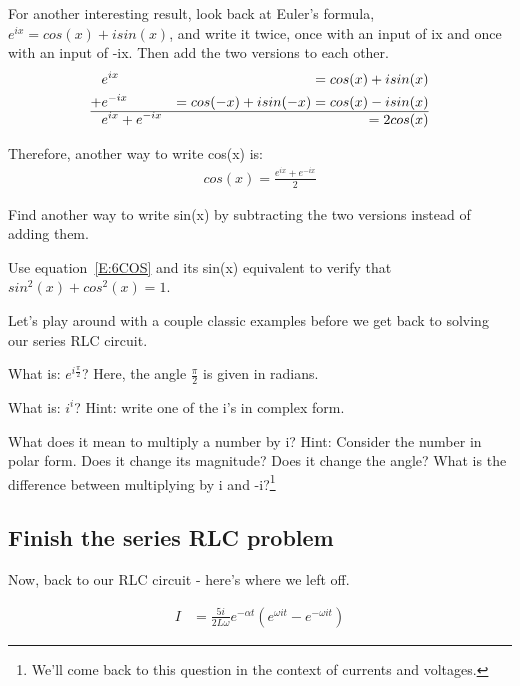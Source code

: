 For another interesting result, look back at Euler's formula, $e^{ix}=cos(x)+isin(x)$, and write it twice, once with an input of ix and once with an input of -ix. Then add the two versions to each other.
\begin{align}
&e^{ix}&=cos(x)+isin(x) \notag\\
+&e^{-ix}&=cos(-x)+isin(-x)=cos(x)-isin(x) \notag\\
\hline
&e^{ix}+e^{-ix}&=2cos(x)
\end{align}

Therefore, another way to write cos(x) is:
\begin{align}
cos(x)=\frac{e^{ix}+e^{-ix}}{2} \label{E:6COS}
\end{align}

\begin{clevel}
Find another way to write sin(x) by subtracting the two versions instead of adding them.
\end{clevel}

\begin{clevel}
Use equation~\eqref{E:6COS} and its sin(x) equivalent to verify that $sin^2(x)+cos^2(x)=1$.
\end{clevel}


Let's play around with a couple classic examples before we get back to solving our series RLC circuit.

\begin{blevel}
What is: $e^{i\frac{\pi}{2}}$? Here, the angle $\frac{\pi}{2}$ is given in radians.
\end{blevel}

\begin{blevel}
What is: $i^i$? Hint: write one of the i's in complex form. 
\end{blevel}

\begin{clevel}
What does it mean to multiply a number by i? Hint: Consider the number in polar form. Does it change its magnitude? Does it change the angle? What is the difference between multiplying by i and -i?\footnote{We'll come back to this question in the context of currents and voltages.}
\end{clevel}

\subsection{Finish the series RLC problem}
Now, back to our RLC circuit - here's where we left off.

\begin{align}
I&=\frac{5i}{2L\omega}e^{-\alpha t}(e^{\omega it}-e^{-\omega it})
\end{align} 

